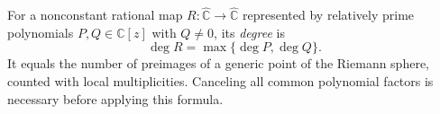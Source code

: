 
For a nonconstant rational map $R:\widehat{\mathbb C}\to\widehat{\mathbb C}$ represented by relatively prime polynomials $P,Q\in\mathbb C[z]$ with $Q\ne0$, its \emph{degree} is
\[
\deg R=\max\{\deg P,\deg Q\}.
\]
It equals the number of preimages of a generic point of the Riemann sphere, counted with local multiplicities. Canceling all common polynomial factors is necessary before applying this formula.
